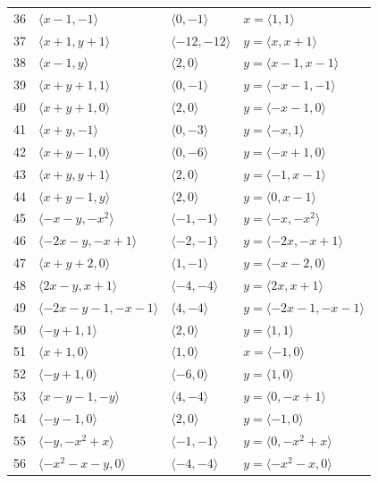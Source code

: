 \documentclass[11pt]{article}
\begin{document}
\begin{longtable}{@{}rlll@{}}
36 & $\langle x-1,-1\rangle$ & $\langle 0,-1\rangle$ & $x=\langle 1,1\rangle$\\
37 & $\langle x+1,y+1\rangle$ & $\langle -12,-12\rangle$ & $y=\langle x,x+1\rangle$\\
38 & $\langle x-1,y\rangle$ & $\langle 2,0\rangle$ & $y=\langle x-1,x-1\rangle$\\
39 & $\langle x+y+1,1\rangle$ & $\langle 0,-1\rangle$ & $y=\langle -x-1,-1\rangle$\\
40 & $\langle x+y+1,0\rangle$ & $\langle 2,0\rangle$ & $y=\langle -x-1,0\rangle$\\
41 & $\langle x+y,-1\rangle$ & $\langle 0,-3\rangle$ & $y=\langle -x,1\rangle$\\
42 & $\langle x+y-1,0\rangle$ & $\langle 0,-6\rangle$ & $y=\langle -x+1,0\rangle$\\
43 & $\langle x+y,y+1\rangle$ & $\langle 2,0\rangle$ & $y=\langle -1,x-1\rangle$\\
44 & $\langle x+y-1,y\rangle$ & $\langle 2,0\rangle$ & $y=\langle 0,x-1\rangle$\\
45 & $\langle -x-y,-x^{2}\rangle$ & $\langle -1,-1\rangle$ & $y=\langle -x,-x^{2}\rangle$\\
46 & $\langle -2x-y,-x+1\rangle$ & $\langle -2,-1\rangle$ & $y=\langle -2x,-x+1\rangle$\\
47 & $\langle x+y+2,0\rangle$ & $\langle 1,-1\rangle$ & $y=\langle -x-2,0\rangle$\\
48 & $\langle 2x-y,x+1\rangle$ & $\langle -4,-4\rangle$ & $y=\langle 2x,x+1\rangle$\\
49 & $\langle -2x-y-1,-x-1\rangle$ & $\langle 4,-4\rangle$ & $y=\langle -2x-1,-x-1\rangle$\\
50 & $\langle -y+1,1\rangle$ & $\langle 2,0\rangle$ & $y=\langle 1,1\rangle$\\
51 & $\langle x+1,0\rangle$ & $\langle 1,0\rangle$ & $x=\langle -1,0\rangle$\\
52 & $\langle -y+1,0\rangle$ & $\langle -6,0\rangle$ & $y=\langle 1,0\rangle$\\
53 & $\langle x-y-1,-y\rangle$ & $\langle 4,-4\rangle$ & $y=\langle 0,-x+1\rangle$\\
54 & $\langle -y-1,0\rangle$ & $\langle 2,0\rangle$ & $y=\langle -1,0\rangle$\\
55 & $\langle -y,-x^{2}+x\rangle$ & $\langle -1,-1\rangle$ & $y=\langle 0,-x^{2}+x\rangle$\\
56 & $\langle -x^{2}-x-y,0\rangle$ & $\langle -4,-4\rangle$ & $y=\langle -x^{2}-x,0\rangle$\\

\end{longtable}
\end{document}
